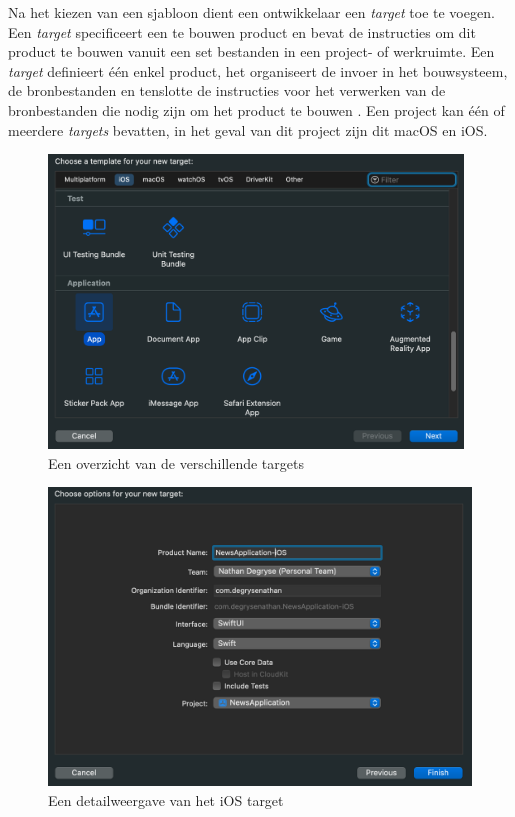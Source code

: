 \pagebreak
Na het kiezen van een sjabloon dient een ontwikkelaar een \textit{target} toe te voegen. Een \textit{target} specificeert een te bouwen product en bevat de instructies om dit product te bouwen vanuit een set bestanden in een project- of werkruimte. Een \textit{target} definieert één enkel product, het organiseert de invoer in het bouwsysteem, de bronbestanden en tenslotte de instructies voor het verwerken van de bronbestanden die nodig zijn om het product te bouwen \autocite{AppleDeveloper2011}. Een project kan één of meerdere \textit{targets} bevatten, in het geval van dit project zijn dit macOS en iOS.
\begin{figure}[!h]
    \centering
    \includegraphics[width=110mm, scale=0.7]{img/iostarget.png}
    \caption{Een overzicht van de verschillende targets}
\end{figure}

\begin{figure}[!h]
    \centering
    \includegraphics[width=120mm, scale=0.7]{img/iostargetdetail.png}
    \caption{Een detailweergave van het iOS target}
\end{figure}


